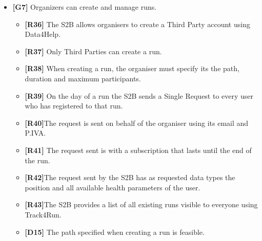\documentclass[titlepage]{article}
\begin{document}
\begin{itemize}
					 \begin{itemize} %
					 	\item {\bf [R33]} Only private users can choose whether or not to enable AutomatedSOS. 
\item {\bf [R34]} AutomatedSOS can be enabled only if the user grants permission to make emergency phone calls. 
\item {\bf [R35]} If AutomatedSOS is enabled and the System detects that a user’s heart rate is below or above the critical threshold for his age, an ambulance is called. 
\item {\bf [D4]} Data provided to the System is related to the person whose account was used to provide it.
\item {\bf [D5]} All health data directly provided by the user represents his real health status.
\item {\bf [D6]}Position data has an accuracy of 10 meters around the actual position.
\item {\bf [D7]} Health data has a relative error lower than 5%
\item {\bf [D8]}Permission to access health and GPS data is always granted to the S2B.
\item {\bf [D12]} Permission to make calls is always granted to the S2B.
\item {\bf [D13]} Users’ smartphones always have signal when needed by AutomatedSOS.
					\end{itemize}
					
					 \item {\bf [G7]}  Organizers can create and manage runs.
				 
					 \begin{itemize} %
					 	\item {\bf [R36]} The S2B allows organisers to create a Third Party account using Data4Help.
\item {\bf [R37]} Only Third Parties can create a run.
\item {\bf [R38]} When creating a run, the organiser must specify its the path, duration and maximum participants.
\item {\bf [R39]} On the day of a run the S2B sends a Single Request to every user who has registered to that run.
\item {\bf [R40]}The request is sent on behalf of the organiser using its email and P.IVA.
\item {\bf [R41]} The request sent is with a subscription that lasts until the end of the run.
\item {\bf [R42]}The request sent by the S2B has as requested data types the position and all available health parameters of the user.
\item {\bf [R43]}The S2B provides a list of all existing runs visible to everyone using Track4Run.
\item {\bf [D15]} The path specified when creating a run is feasible. 


\end{itemize}
\end{itemize}
\end{document}
